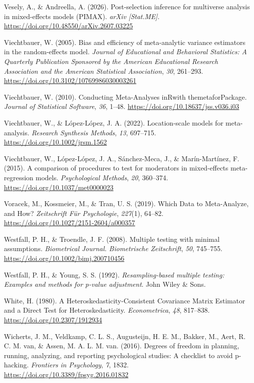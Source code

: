 \documentclass[
  man,
  longtable,
  nolmodern,
  notxfonts,
  notimes,
  colorlinks=true,linkcolor=blue,citecolor=blue,urlcolor=blue]{apa7}
\newlength{\cslhangindent}
\newenvironment{CSLReferences}[2] %
 {\begin{list}{}{%
  \setlength{\itemindent}{0pt}
  \setlength{\leftmargin}{0pt}
  \setlength{\parsep}{0pt}
  \ifodd #1
   \setlength{\leftmargin}{\cslhangindent}
   \setlength{\itemindent}{-1\cslhangindent}
  \fi
  \setlength{\itemsep}{#2\baselineskip}}}
 {\end{list}}
\begin{document}
\begin{CSLReferences}{1}{0}
Vesely, A., \& Andreella, A. (2026). {Post-selection inference for
multiverse analysis in mixed-effects models (PIMAX)}. \emph{arXiv
{[}Stat.ME{]}}. \url{https://doi.org/10.48550/arXiv.2607.03225}

Viechtbauer, W. (2005). {Bias and efficiency of meta-analytic variance
estimators in the random-effects model}. \emph{Journal of Educational
and Behavioral Statistics: A Quarterly Publication Sponsored by the
American Educational Research Association and the American Statistical
Association}, \emph{30}, 261--293.
\url{https://doi.org/10.3102/10769986030003261}

Viechtbauer, W. (2010). {Conducting Meta-Analyses in{R}with
the{metafor}Package}. \emph{Journal of Statistical Software}, \emph{36},
1--48. \url{https://doi.org/10.18637/jss.v036.i03}

Viechtbauer, W., \& López-López, J. A. (2022). {Location-scale models
for meta-analysis}. \emph{Research Synthesis Methods}, \emph{13},
697--715. \url{https://doi.org/10.1002/jrsm.1562}

Viechtbauer, W., López-López, J. A., Sánchez-Meca, J., \&
Marín-Martínez, F. (2015). {A comparison of procedures to test for
moderators in mixed-effects meta-regression models}. \emph{Psychological
Methods}, \emph{20}, 360--374. \url{https://doi.org/10.1037/met0000023}

Voracek, M., Kossmeier, M., \& Tran, U. S. (2019). Which {Data} to
{Meta}-{Analyze}, and {How}? \emph{Zeitschrift Für Psychologie},
\emph{227}(1), 64--82. \url{https://doi.org/10.1027/2151-2604/a000357}

Westfall, P. H., \& Troendle, J. F. (2008). {Multiple testing with
minimal assumptions}. \emph{Biometrical Journal. Biometrische
Zeitschrift}, \emph{50}, 745--755.
\url{https://doi.org/10.1002/bimj.200710456}

Westfall, P. H., \& Young, S. S. (1992). \emph{{Resampling-based
multiple testing: Examples and methods for p-value adjustment}}. John
Wiley \& Sons.

White, H. (1980). {A Heteroskedasticity-Consistent Covariance Matrix
Estimator and a Direct Test for Heteroskedasticity}.
\emph{Econometrica}, \emph{48}, 817--838.
\url{https://doi.org/10.2307/1912934}

Wicherts, J. M., Veldkamp, C. L. S., Augusteijn, H. E. M., Bakker, M.,
Aert, R. C. M. van, \& Assen, M. A. L. M. van. (2016). {Degrees of
freedom in planning, running, analyzing, and reporting psychological
studies: A checklist to avoid p-hacking}. \emph{Frontiers in
Psychology}, \emph{7}, 1832.
\url{https://doi.org/10.3389/fpsyg.2016.01832}

\end{CSLReferences}
\end{document}
